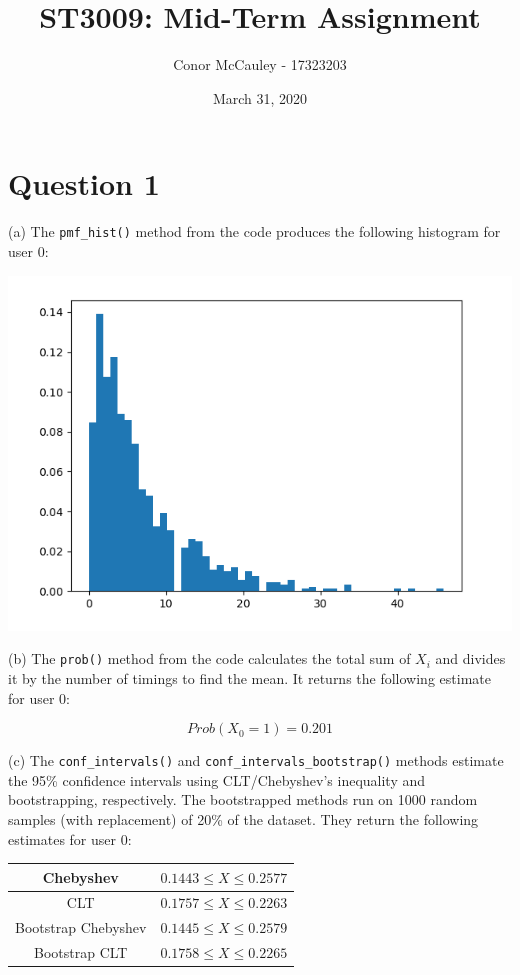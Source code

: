 \documentclass[12pt]{article}
\title{\vspace{-5ex}ST3009: Mid-Term Assignment\vspace{-2.5ex}}
\author{Conor McCauley - 17323203}
\date{\vspace{-2ex}March 31, 2020\vspace{-2ex}}
\begin{document}
\maketitle

\section*{Question 1}

\noindent (a) The \texttt{pmf\_hist()} method from the code produces the following histogram for user 0:

\begin{center}
    \includegraphics[scale=0.6]{q1_hist.png}
\end{center}

\noindent (b) The \texttt{prob()} method from the code calculates the total sum of $X_i$ and divides it by the number of timings to find the mean. It returns the following estimate for user 0:

$$ Prob(X_0 = 1) = 0.201 $$

\noindent (c) The \texttt{conf\_intervals()} and \texttt{conf\_intervals\_bootstrap()} methods estimate the 95\% confidence intervals using CLT/Chebyshev's inequality and bootstrapping, respectively. The bootstrapped methods run on 1000 random samples (with replacement) of 20\% of the dataset. They return the following estimates for user 0:

\begin{center}
    \begin{tabular}{|c|c|}
        \hline
        Chebyshev & $0.1443 \le X \le 0.2577$ \\ \hline
        CLT & $0.1757 \le X \le 0.2263$ \\ \hline
        Bootstrap Chebyshev & $0.1445 \le X \le 0.2579$ \\ \hline
        Bootstrap CLT & $0.1758 \le X \le 0.2265$ \\ \hline
    \end{tabular}
\end{center}
\end{document}
